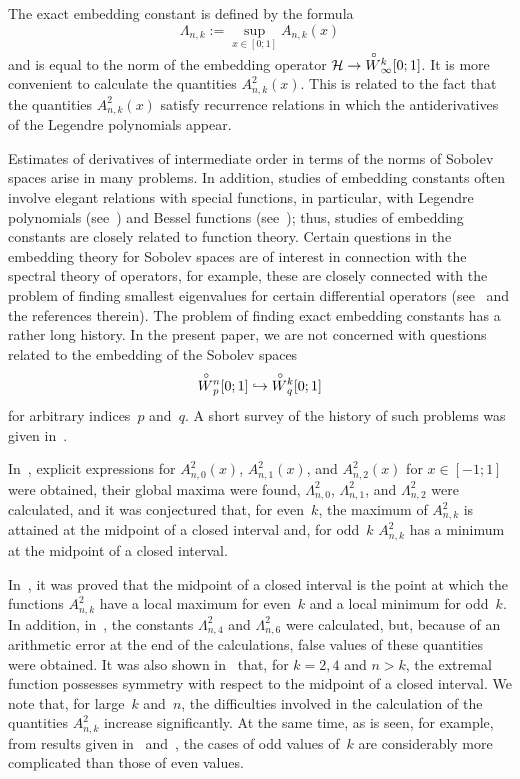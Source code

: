 \documentclass[12pt,oneside]{amsproc}
\numberwithin{equation}{section}
\newcommand{\Wo}{{\raisebox{0.2ex}{$\stackrel{\circ}{W}$}}{}}
\begin{document}
 The exact embedding constant is defined
by the formula
\begin{equation}
\label{eq:const_emb}
\Lambda_{n,k}:=\sup_{x\in[0;1]} A_{n,k}(x)
\end{equation}
and is equal to the norm of the embedding operator
$\mathcal H\to \Wo^k_\infty[0;1]$.
 It is more convenient to calculate the quantities
$A^2_{n,k}(x)$.
 This is related to the fact that the quantities
$A^2_{n,k}(x)$
satisfy recurrence relations
in which the antiderivatives of the Legendre polynomials appear.

 Estimates of derivatives of intermediate order
in terms of the norms of Sobolev spaces
arise in many problems.
 In addition,
studies of embedding constants often involve
elegant relations with special functions,
in particular, with Legendre polynomials
(see~\cite{Kalyab}) and Bessel functions
(see~\cite{Naz});
thus, studies of embedding constants are closely related
to function theory.
 Certain questions in the embedding theory for Sobolev spaces
are of interest in connection with the spectral theory of operators,
for example, these are closely connected
with the problem of finding smallest eigenvalues for certain differential operators
(see~\cite{Kalyab} and the references therein).
 The problem of finding exact embedding constants
has a rather long history.
 In the present paper,
we are not concerned with questions
related to the embedding of the Sobolev spaces
$$
\Wo_p^n[0;1] \hookrightarrow \Wo_q^k[0;1]
$$
for arbitrary indices~$p$ and~$q$.
 A short survey of the history of such problems
was given in~\cite{NazM}.

 In~\cite{Kalyab}, explicit expressions for
$A^2_{n,0}(x)$, $A^2_{n,1}(x)$,
and
$A^2_{n,2}(x)$
for
$x\in[-1;1]$ were obtained,
their global maxima were found,
$\Lambda^2_{n,0}$, $\Lambda^2_{n,1}$,
and
$\Lambda^2_{n,2}$ were calculated,
and it was conjectured that, for even~$k$,
the maximum of
$A^2_{n,k}$
is attained
at the midpoint of a closed interval
and,
for odd~$k$
$A^2_{n,k}$ has a minimum
at the midpoint of a closed interval.

 In~\cite{NazM},
it was proved that
the midpoint of a closed interval
is the point at which the functions
$A^2_{n,k}$
have a local maximum for even~$k$
and a local minimum
for odd~$k$.
 In addition,
in~\cite{NazM}, the constants
$\Lambda^2_{n,4}$
and
$\Lambda^2_{n,6}$
were calculated,
but, because of an arithmetic error
at the end of the calculations,
false values of these quantities were obtained.
 It was also shown in~\cite{NazM} that, for
$k=2,4$
and
$n>k$,
the extremal function
possesses symmetry with respect to the midpoint of a closed interval.
 We note that, for
large~$k$ and~$n$,
the difficulties involved in the calculation of the quantities
$A^2_{n,k}$
increase significantly.
 At the same time,
as is seen, for example, from results given in~\cite{Kalyab}
and~\cite{GarmSh},
the cases of odd values of~$k$
are considerably more complicated than those of even values.
\end{document}
